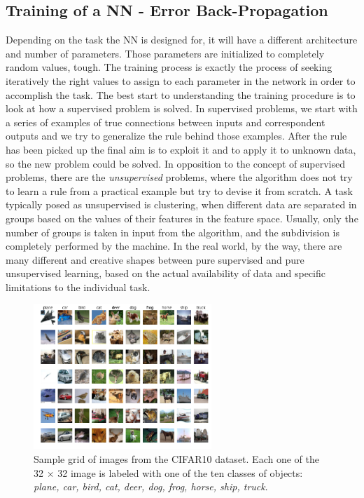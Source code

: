 \subsection{Training of a NN -  Error Back-Propagation}
Depending on the task the NN is designed for, it will have a different architecture and number of parameters. Those parameters are initialized to completely random values, tough. The training process is exactly the process of seeking iteratively the right values to assign to each parameter in the network in order to accomplish the task. The best start to understanding the training procedure is to look at how a supervised problem is solved. In supervised problems, we start with a series of examples of true connections between inputs and correspondent outputs and we try to generalize the rule behind those examples. After the rule has been picked up the final aim is to exploit it and to apply it to unknown data, so the new problem could be solved. In opposition to the concept of supervised problems, there are the \textit{unsupervised} problems, where the algorithm does not try to learn a rule from a practical example but try to devise it from scratch. A task typically posed as unsupervised is clustering, when different data are separated in groups based on the values of their features in the feature space. Usually, only the number of groups is taken in input from the algorithm, and the subdivision is completely performed by the machine. In the real world, by the way, there are many different and creative shapes between pure supervised and pure unsupervised learning, based on the actual availability of data and specific limitations to the individual task.

\begin{figure}
    \centering
    \includegraphics[width = 0.6\textwidth]{images/cifar10}
    \caption{Sample grid of images from the CIFAR10 dataset. Each one of the 32 $\times$ 32 image is labeled with one of the ten classes of objects: \textit{plane, car, bird, cat, deer, dog, frog, horse, ship, truck}.}
    \label{fig:cf10}
\end{figure}


